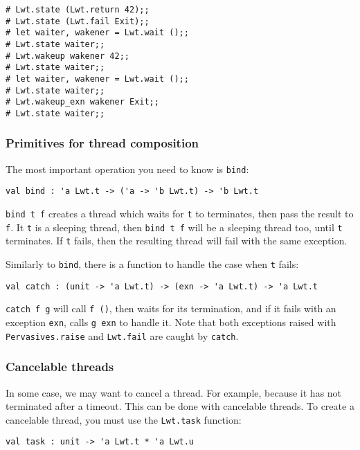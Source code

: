 \documentclass{article}
\begin{document}
\begin{verbatim}
# Lwt.state (Lwt.return 42);;
# Lwt.state (Lwt.fail Exit);;
# let waiter, wakener = Lwt.wait ();;
# Lwt.state waiter;;
# Lwt.wakeup wakener 42;;
# Lwt.state waiter;;
# let waiter, wakener = Lwt.wait ();;
# Lwt.state waiter;;
# Lwt.wakeup_exn wakener Exit;;
# Lwt.state waiter;;
\end{verbatim}

\subsubsection{Primitives for thread composition}

The most important operation you need to know is \texttt{bind}:

\begin{verbatim}
val bind : 'a Lwt.t -> ('a -> 'b Lwt.t) -> 'b Lwt.t
\end{verbatim}

\texttt{bind t f} creates a thread which waits for \texttt{t} to
terminates, then pass the result to \texttt{f}. It \texttt{t} is a
sleeping thread, then \texttt{bind t f} will be a sleeping thread too,
until \texttt{t} terminates. If \texttt{t} fails, then the resulting
thread will fail with the same exception.

Similarly to \texttt{bind}, there is a function to handle the case
when \texttt{t} fails:

\begin{verbatim}
val catch : (unit -> 'a Lwt.t) -> (exn -> 'a Lwt.t) -> 'a Lwt.t
\end{verbatim}

\texttt{catch f g} will call \texttt{f ()}, then waits for its
termination, and if it fails with an exception \texttt{exn}, calls
\texttt{g exn} to handle it. Note that both exceptions raised with
\texttt{Pervasives.raise} and \texttt{Lwt.fail} are caught by
\texttt{catch}.

\subsubsection{Cancelable threads}

In some case, we may want to cancel a thread. For example, because it
has not terminated after a timeout. This can be done with cancelable
threads. To create a cancelable thread, you must use the
\texttt{Lwt.task} function:

\begin{verbatim}
val task : unit -> 'a Lwt.t * 'a Lwt.u
\end{verbatim}
\end{document}
